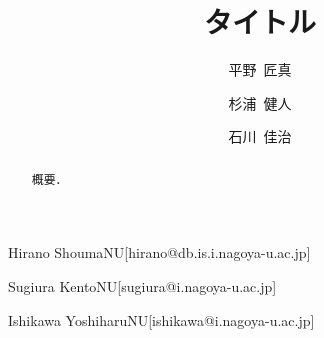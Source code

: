 \documentclass[
  submit,
  techrep,
  noauthor,
  a4paper,
  notitlepage,
  ja=standard,
  autodetect-engine,
  dvi=dvipdfmx
]{ipsj}
\begin{document}
\title{タイトル}


\author{平野~匠真}{Hirano Shouma}{NU}[hirano@db.is.i.nagoya-u.ac.jp]
\author{杉浦~健人}{Sugiura Kento}{NU}[sugiura@i.nagoya-u.ac.jp]
\author{石川~佳治}{Ishikawa Yoshiharu}{NU}[ishikawa@i.nagoya-u.ac.jp]

\begin{abstract}
  概要．
\end{abstract}

\maketitle





\end{document}

